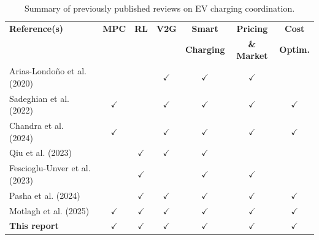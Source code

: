 \documentclass[review]{elsarticle}
\begin{document}
\begin{table}[!htbp]
\centering
\caption{Summary of previously published reviews on EV charging coordination.}
\label{tab:reviews}
\footnotesize
\begin{tabular}{p{4cm}cccccc}
\toprule
\textbf{Reference(s)} & \textbf{MPC} & \textbf{RL} & \textbf{V2G} & \textbf{Smart} & \textbf{Pricing} & \textbf{Cost} \\
& & & & \textbf{Charging} & \textbf{\& Market} & \textbf{Optim.} \\
\midrule
Arias-Londo\~{n}o et al. (2020) & & & $\checkmark$ & $\checkmark$ & $\checkmark$ & \\
Sadeghian et al. (2022)~\cite{sadeghian2022comprehensive} & $\checkmark$ & & $\checkmark$ & $\checkmark$ & $\checkmark$ & $\checkmark$ \\
Chandra et al. (2024)~\cite{chandra2024comprehensive} & $\checkmark$ & & $\checkmark$ & $\checkmark$ & $\checkmark$ & $\checkmark$ \\
Qiu et al. (2023)~\cite{qiu2023rl} & & $\checkmark$ & $\checkmark$ & $\checkmark$ & & \\
Fescioglu-Unver et al. (2023)~\cite{fescioglu2023ev} & & $\checkmark$ & & $\checkmark$ & $\checkmark$ & \\
Pasha et al. (2024)~\cite{pasha2024ev} & & $\checkmark$ & $\checkmark$ & $\checkmark$ & $\checkmark$ & $\checkmark$ \\
Motlagh et al. (2025)~\cite{motlagh2025applied} & $\checkmark$ & $\checkmark$ & $\checkmark$ & $\checkmark$ & $\checkmark$ & $\checkmark$ \\
\midrule
\textbf{This report} & $\checkmark$ & $\checkmark$ & $\checkmark$ & $\checkmark$ & $\checkmark$ & $\checkmark$ \\
\bottomrule
\end{tabular}
\end{table}
\end{document}
